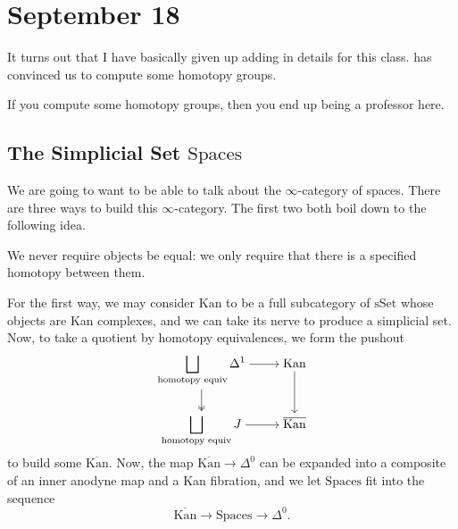 \documentclass[../notes.tex]{subfiles}
\begin{document}
\section{September 18}
It turns out that I have basically given up adding in details for this class.  has convinced us to compute some homotopy groups.
\begin{remark}
	If you compute some homotopy groups, then you end up being a professor here.
\end{remark}

\subsection{The Simplicial Set \texorpdfstring{$\mathrm{Spaces}$}{ Spaces}}
We are going to want to be able to talk about the $\infty$-category of spaces. There are three ways to build this $\infty$-category. The first two both boil down to the following idea.
\begin{idea}
	We never require objects be equal: we only require that there is a specified homotopy between them.
\end{idea}
For the first way, we may consider $\mathrm{Kan}$ to be a full subcategory of $\mathrm{sSet}$ whose objects are Kan complexes, and we can take its nerve to produce a simplicial set. Now, to take a quotient by homotopy equivalences, we form the pushout
\[\begin{tikzcd}[cramped]
	{\displaystyle\bigsqcup_{\text{homotopy equiv}}\Delta^1} & {\mathrm{Kan}} \\
	{\displaystyle\bigsqcup_{\text{homotopy equiv}}J} & {\overline{\mathrm{Kan}}}
	\arrow[from=1-1, to=1-2]
	\arrow[two heads, from=1-1, to=2-1]
	\arrow[from=1-2, to=2-2]
	\arrow[from=2-1, to=2-2]
\end{tikzcd}\]
to build some $\overline{\mathrm{Kan}}$. Now, the map $\overline{\mathrm{Kan}}\to\Delta^0$ can be expanded into a composite of an inner anodyne map and a Kan fibration, and we let $\mathrm{Spaces}$ fit into the sequence
\[\overline{\mathrm{Kan}}\to\mathrm{Spaces}\to\Delta^0.\]
\end{document}
